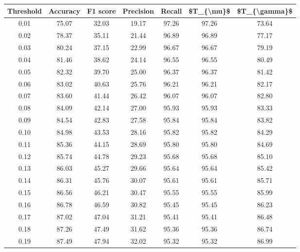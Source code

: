 \begin{tabular}{|c|c|c|c|c|c|c|}
\hline
 Threshold &  Accuracy &  F1 score &  Precision &  Recall &  \$T\_\{\textbackslash mu\}\$ &  \$T\_\{\textbackslash gamma\}\$ \\
\hline
      0.01 &     75.07 &     32.03 &      19.17 &   97.26 &      97.26 &         73.64 \\
      0.02 &     78.37 &     35.11 &      21.44 &   96.89 &      96.89 &         77.17 \\
      0.03 &     80.24 &     37.15 &      22.99 &   96.67 &      96.67 &         79.19 \\
      0.04 &     81.46 &     38.62 &      24.14 &   96.55 &      96.55 &         80.49 \\
      0.05 &     82.32 &     39.70 &      25.00 &   96.37 &      96.37 &         81.42 \\
      0.06 &     83.02 &     40.63 &      25.76 &   96.21 &      96.21 &         82.17 \\
      0.07 &     83.60 &     41.44 &      26.42 &   96.07 &      96.07 &         82.80 \\
      0.08 &     84.09 &     42.14 &      27.00 &   95.93 &      95.93 &         83.33 \\
      0.09 &     84.54 &     42.83 &      27.58 &   95.84 &      95.84 &         83.82 \\
      0.10 &     84.98 &     43.53 &      28.16 &   95.82 &      95.82 &         84.29 \\
      0.11 &     85.36 &     44.15 &      28.69 &   95.80 &      95.80 &         84.69 \\
      0.12 &     85.74 &     44.78 &      29.23 &   95.68 &      95.68 &         85.10 \\
      0.13 &     86.03 &     45.27 &      29.66 &   95.64 &      95.64 &         85.42 \\
      0.14 &     86.31 &     45.76 &      30.07 &   95.61 &      95.61 &         85.71 \\
      0.15 &     86.56 &     46.21 &      30.47 &   95.55 &      95.55 &         85.99 \\
      0.16 &     86.78 &     46.59 &      30.82 &   95.45 &      95.45 &         86.23 \\
      0.17 &     87.02 &     47.04 &      31.21 &   95.41 &      95.41 &         86.48 \\
      0.18 &     87.26 &     47.49 &      31.62 &   95.36 &      95.36 &         86.74 \\
      0.19 &     87.49 &     47.94 &      32.02 &   95.32 &      95.32 &         86.99 \\

\end{tabular}
